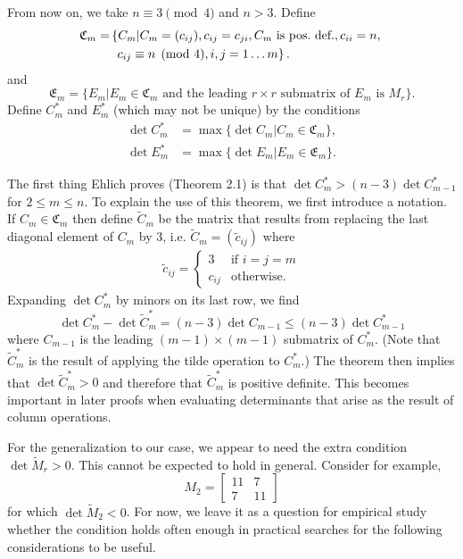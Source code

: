 \documentclass[11pt,a4paper]{article}
\begin{document}
{From} now on, we take $n\equiv3\pmod{4}$ and $n>3$.  Define
\begin{align}
\mathfrak{C}_m=&\left\{C_m|C_m=(c_{ij}),c_{ij}=c_{ji},C_m\text{ is pos.\ def.},c_{ii}=n,\right.\notag\\
&\ \left.c_{ij}\equiv n\pmod{4},i,j=1\ldots m\right\}.
\end{align}
and
\begin{equation}
\mathfrak{E}_m=\{E_m|\text{$E_m\in \mathfrak{C}_m$ and the 
leading $r\times r$ submatrix of $E_m$ is $M_r$}\}.
\end{equation}
Define $C_m^*$ and $E_m^*$ (which  may not be unique) by the conditions
\begin{align*}
\det C_m^*&=\max\{\det C_m|C_m\in\mathfrak{C}_m\},\\
\det E_m^*&=\max\{\det E_m|E_m\in\mathfrak{E}_m\}.
\end{align*}

The first thing Ehlich proves (Theorem 2.1) is that 
$\det C_m^*>(n-3)\det C_{m-1}^*$ for $2\le m\le n$.  
To explain the use of this theorem, we first introduce a notation.  
If $C_m\in\mathfrak{C}_m$ then define ${\tilde C}_m$ be the matrix 
that results from replacing the last diagonal element of $C_m$ by 3, 
i.e. ${\tilde C}_m=({\tilde c}_{ij})$ where
\begin{align*}
\tilde c_{ij}=\begin{cases}
3 & \text{if $i=j=m$}\\
c_{ij} & \text{otherwise.}
\end{cases}
\end{align*}
Expanding $\det C_m^*$ by minors on its last row, we find
\begin{equation}
\det C_m^*-\det\tilde C_m^*=(n-3)\det C_{m-1}\le(n-3)\det C_{m-1}^*
\end{equation}
where $C_{m-1}$ is the leading $(m-1)\times(m-1)$ submatrix of $C_m^*$. 
(Note that $\tilde C_m^*$ is the result of applying the tilde operation to
$C_m^*$.) The theorem then implies that $\det\tilde C_m^*>0$ and therefore
that $\tilde C_m^*$ is positive definite.  This becomes important in later
proofs when evaluating determinants that arise as the result of column
operations.

For the generalization to our case, we appear to need the extra condition
$\det\tilde M_r>0$.  This cannot be expected to hold in general.  Consider
for example,
\begin{equation}
M_2=\begin{bmatrix}11 & 7\\7 & 11\end{bmatrix}
\end{equation}
for which $\det\tilde M_2<0$.  For now, we leave it as a question for
empirical study whether the condition holds often enough in practical
searches for the following considerations to be useful.
\end{document}
